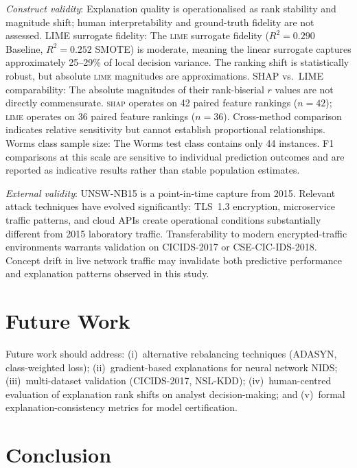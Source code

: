 \documentclass[conference,a4paper]{IEEEtran}
\newcommand{\SHAP}{\textsc{shap}\xspace}
\newcommand{\LIME}{\textsc{lime}\xspace}
\newcommand{\NIDS}{NIDS\xspace}
\begin{document}
\textit{Construct validity}: Explanation quality is operationalised as rank
stability and magnitude shift; human interpretability and ground-truth fidelity
are not assessed. LIME surrogate fidelity: The \LIME surrogate fidelity
($R^2 = 0.290$ Baseline, $R^2 = 0.252$ SMOTE) is moderate, meaning the linear
surrogate captures approximately 25--29\% of local decision variance. The ranking
shift is statistically robust, but absolute \LIME magnitudes are approximations.
SHAP vs.\ LIME comparability: The absolute magnitudes of their rank-biserial $r$
values are not directly commensurate. \SHAP operates on 42 paired feature rankings
($n=42$); \LIME operates on 36 paired feature rankings ($n=36$). Cross-method
comparison indicates relative sensitivity but cannot establish proportional
relationships. Worms class sample size: The Worms test class contains only 44
instances. F1 comparisons at this scale are sensitive to individual prediction
outcomes and are reported as indicative results rather than stable population
estimates.

\textit{External validity}: UNSW-NB15 is a point-in-time capture from 2015.
Relevant attack techniques have evolved significantly: TLS~1.3 encryption,
microservice traffic patterns, and cloud APIs create operational conditions
substantially different from 2015 laboratory traffic. Transferability to modern
encrypted-traffic environments warrants validation on CICIDS-2017 or
CSE-CIC-IDS-2018. Concept drift in live network traffic may invalidate both
predictive performance and explanation patterns observed in this study.

\section{Future Work}
\label{sec:future}

Future work should address: (i)~alternative rebalancing techniques (ADASYN,
class-weighted loss); (ii)~gradient-based explanations for neural network \NIDS;
(iii)~multi-dataset validation (CICIDS-2017, NSL-KDD); (iv)~human-centred
evaluation of explanation rank shifts on analyst decision-making; and
(v)~formal explanation-consistency metrics for model certification.

\IEEEtriggerfinalcols
\section{Conclusion}
\label{sec:conclusion}
\end{document}
